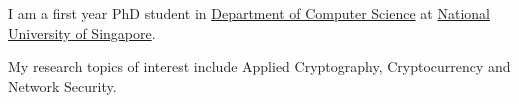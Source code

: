 

\begin{cvparagraph}

I am a first year PhD student in \href{http://www.comp.nus.edu.sg/about/depts/cs/}{Department of Computer Science} at \href{http://nus.edu.sg/}{National University of Singapore}.

My research topics of interest include Applied Cryptography, Cryptocurrency and Network Security.

\end{cvparagraph}
